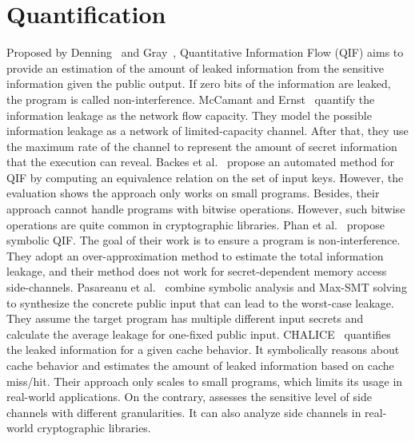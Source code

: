 \section{Quantification}
Proposed by Denning~\cite{robling1982cryptography} and Gray~\cite{gray1992toward},
Quantitative Information Flow (QIF) aims to provide an estimation of the amount of leaked information from the sensitive information given the public output. If zero bits
of the information are leaked, the program is called non-interference. 
McCamant and Ernst~\cite{McCamantE2008} quantify the information leakage as the network
flow capacity. They model the possible information leakage as a network of limited-capacity
channel. After that, they use the maximum rate of the channel to represent the amount of secret information that the execution can reveal.
Backes et al.~\cite{5207642} propose an automated method for QIF
by computing an equivalence relation on the set of input keys. However,
the evaluation shows the approach only works on small programs.
Besides, their approach cannot handle programs with bitwise operations.
However, such bitwise operations are quite common in cryptographic libraries.
Phan et al.~\cite{Phan:2012:SQI:2382756.2382791} propose symbolic QIF. The goal of their
work is to ensure a program is non-interference. They adopt an over-approximation method to estimate the total information leakage, and their method
does not work for secret-dependent memory access side-channels.
Pasareanu et al.~\cite{pasareanu2016multi} combine symbolic analysis and Max-SMT solving to synthesize the concrete public input that can lead to the worst-case leakage. They assume the target program has multiple different input secrets and calculate the average leakage for one-fixed public input.
CHALICE~\cite{Chattopadhyay:2017:QIL:3127041.3127044} quantifies the leaked
information for a given cache behavior.
It symbolically reasons about cache
behavior and estimates the amount of leaked information based on cache miss/hit.
Their approach only scales to small programs, which limits its usage in
real-world applications. On the contrary, \tool{} assesses the sensitive level
of side channels with different granularities. It can also analyze side channels in real-world cryptographic libraries.

